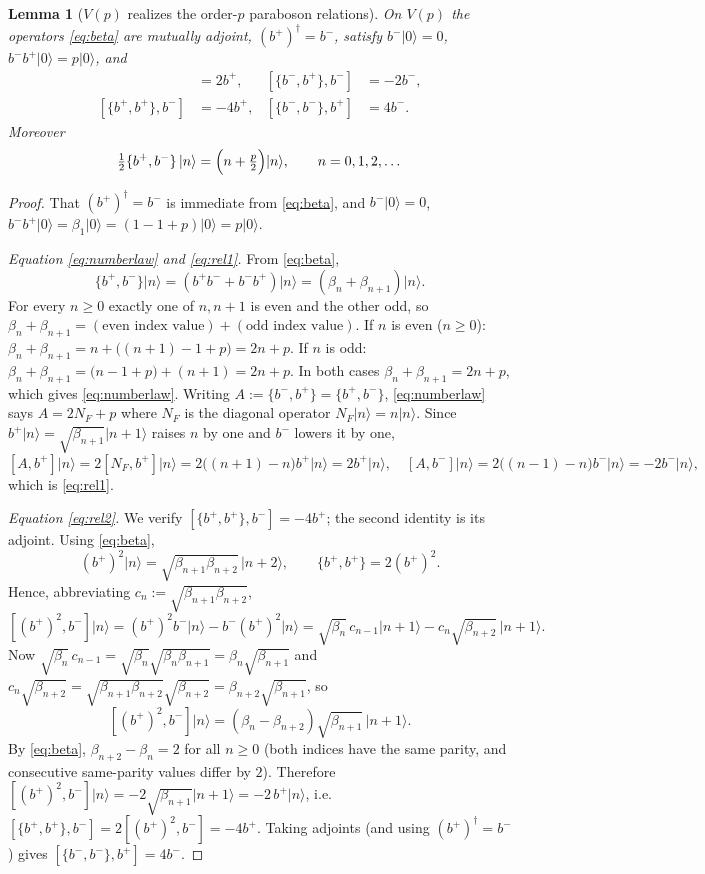 \documentclass[12pt]{article}
\newtheorem{lemma}{Lemma}
\theoremstyle{definition}
\theoremstyle{remark}
\newcommand{\ket}[1]{\lvert #1\rangle}
\newcommand{\bp}{b^{+}}
\newcommand{\bm}{b^{-}}
\begin{document}
\begin{lemma}[$V(p)$ realizes the order-$p$ paraboson relations]\label{lem:relations}
On $V(p)$ the operators \eqref{eq:beta} are mutually adjoint, $(\bp)^{\dagger}=\bm$,
satisfy $\bm\ket{0}=0$, $\bm\bp\ket0=p\ket0$, and
\begin{align}
[\{\bm,\bp\},\bp]&=2\bp, & [\{\bm,\bp\},\bm]&=-2\bm,\label{eq:rel1}\\
[\{\bp,\bp\},\bm]&=-4\bp, & [\{\bm,\bm\},\bp]&=4\bm.\label{eq:rel2}
\end{align}
Moreover
\begin{equation}\label{eq:numberlaw}
\tfrac12\{\bp,\bm\}\,\ket{n}=\Bigl(n+\tfrac p2\Bigr)\ket{n},\qquad n=0,1,2,\dots
\end{equation}
\end{lemma}

\begin{proof}
That $(\bp)^{\dagger}=\bm$ is immediate from \eqref{eq:beta}, and
$\bm\ket0=0$, $\bm\bp\ket0=\beta_1\ket0=(1-1+p)\ket0=p\ket0$.

\emph{Equation \eqref{eq:numberlaw} and \eqref{eq:rel1}.}
From \eqref{eq:beta},
\begin{equation}\label{eq:anticomm}
\{\bp,\bm\}\ket{n}=(\bp\bm+\bm\bp)\ket{n}=(\beta_n+\beta_{n+1})\ket{n}.
\end{equation}
For every $n\ge0$ exactly one of $n,n+1$ is even and the other odd, so
$\beta_n+\beta_{n+1}=(\text{even index value})+(\text{odd index value})$. If $n$ is
even ($n\ge0$): $\beta_n+\beta_{n+1}=n+\bigl((n+1)-1+p\bigr)=2n+p$. If $n$ is odd:
$\beta_n+\beta_{n+1}=\bigl(n-1+p\bigr)+(n+1)=2n+p$. In both cases
$\beta_n+\beta_{n+1}=2n+p$, which gives \eqref{eq:numberlaw}. Writing
$A:=\{\bm,\bp\}=\{\bp,\bm\}$, \eqref{eq:numberlaw} says $A=2N_F+p$ where $N_F$ is
the diagonal operator $N_F\ket n=n\ket n$. Since $\bp\ket n=\sqrt{\beta_{n+1}}\ket{n+1}$
raises $n$ by one and $\bm$ lowers it by one,
\[
[A,\bp]\ket n=2[N_F,\bp]\ket n=2\bigl((n+1)-n\bigr)\bp\ket n=2\bp\ket n,\quad
[A,\bm]\ket n=2\bigl((n-1)-n\bigr)\bm\ket n=-2\bm\ket n,
\]
which is \eqref{eq:rel1}.

\emph{Equation \eqref{eq:rel2}.}
We verify $[\{\bp,\bp\},\bm]=-4\bp$; the second identity is its adjoint. Using
\eqref{eq:beta},
\[
(\bp)^2\ket n=\sqrt{\beta_{n+1}\beta_{n+2}}\,\ket{n+2},\qquad
\{\bp,\bp\}=2(\bp)^2 .
\]
Hence, abbreviating $c_n:=\sqrt{\beta_{n+1}\beta_{n+2}}$,
\[
[(\bp)^2,\bm]\ket n=(\bp)^2\bm\ket n-\bm(\bp)^2\ket n
=\sqrt{\beta_n}\,c_{n-1}\ket{n+1}-c_n\sqrt{\beta_{n+2}}\,\ket{n+1}.
\]
Now $\sqrt{\beta_n}\,c_{n-1}=\sqrt{\beta_n}\sqrt{\beta_n\beta_{n+1}}=\beta_n\sqrt{\beta_{n+1}}$ and
$c_n\sqrt{\beta_{n+2}}=\sqrt{\beta_{n+1}\beta_{n+2}}\sqrt{\beta_{n+2}}=\beta_{n+2}\sqrt{\beta_{n+1}}$,
so
\[
[(\bp)^2,\bm]\ket n=(\beta_n-\beta_{n+2})\sqrt{\beta_{n+1}}\,\ket{n+1}.
\]
By \eqref{eq:beta}, $\beta_{n+2}-\beta_n=2$ for all $n\ge0$ (both indices have the
same parity, and consecutive same-parity values differ by $2$). Therefore
$[(\bp)^2,\bm]\ket n=-2\sqrt{\beta_{n+1}}\ket{n+1}=-2\,\bp\ket n$, i.e.
$[\{\bp,\bp\},\bm]=2[(\bp)^2,\bm]=-4\bp$. Taking adjoints (and using
$(\bp)^{\dagger}=\bm$) gives $[\{\bm,\bm\},\bp]=4\bm$.
\end{proof}
\end{document}
